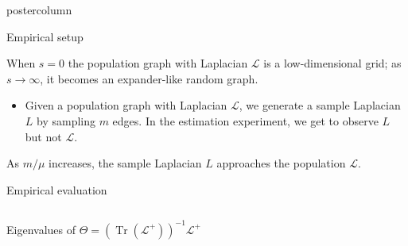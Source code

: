 \documentclass[final,hyperref={pdfpagelabels=false}]{beamer}
\DeclareMathOperator{\Tr}{Tr}
\begin{document}
\begin{frame}
\begin{columns}
\begin{column}{.49\textwidth}
\begin{beamercolorbox}[center,wd=\textwidth]{postercolumn}
\begin{minipage}[T]{.95\textwidth}
{\begin{block}{Empirical setup}
  \begin{center}
  \end{center}
  \vspace{-1em}
  When $s = 0$ the population graph with Laplacian $\mathcal{L}$ is a
  low-dimensional grid; as $s \to \infty$, it becomes an expander-like 
  random graph.
  \vspace{1em}

	    \begin{itemize}
  \item Given a population graph with Laplacian $\mathcal{L}$,
  we generate a sample Laplacian $L$ by sampling $m$ edges.
  In the estimation experiment, we get to observe $L$ but not $\mathcal{L}$.
	    \end{itemize}

  \begin{center}
  \end{center}
  \vspace{-1em}

  As $m / \mu$ increases, the sample Laplacian $L$ approaches the
  population $\mathcal{L}$.

  
	    \end{block}

	    \vfill

            \begin{block}{Empirical evaluation}
\begin{columns}
  \begin{column}{.25\textwidth}
    \begin{center}
    {\tiny Eigenvalues of $\Theta = (\Tr(\mathcal{L^+}))^{-1} \mathcal{L^+}$}
    \vspace{-0.5em}


\end{center}
\end{column}
\end{columns}
\end{block}}
\end{minipage}
\end{beamercolorbox}
\end{column}
\end{columns}
\end{frame}
\end{document}
